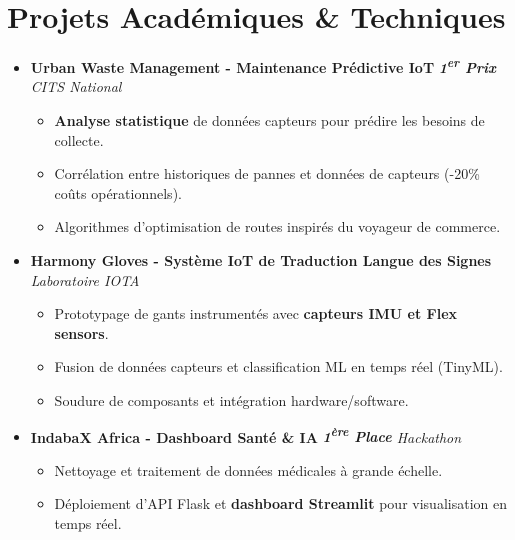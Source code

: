 \documentclass[a4paper,11pt]{article}
\begin{document}
\section{Projets Académiques \& Techniques}
\begin{itemize}[leftmargin=*, label={}]

\item \textbf{Urban Waste Management - Maintenance Prédictive IoT} \hfill \textit{\textbf{1\textsuperscript{er} Prix} CITS National}
\vspace{-2pt}
    \begin{itemize}[leftmargin=0.4cm, nosep, label=\tiny$\bullet$]
        \item \small{\textbf{Analyse statistique} de données capteurs pour prédire les besoins de collecte.}
        \item \small{Corrélation entre historiques de pannes et données de capteurs (-20\% coûts opérationnels).}
        \item \small{Algorithmes d'optimisation de routes inspirés du voyageur de commerce.}
    \end{itemize}
    \vspace{3pt}

\item \textbf{Harmony Gloves - Système IoT de Traduction Langue des Signes} \hfill \textit{Laboratoire IOTA}
\vspace{-2pt}
    \begin{itemize}[leftmargin=0.4cm, nosep, label=\tiny$\bullet$]
        \item \small{Prototypage de gants instrumentés avec \textbf{capteurs IMU et Flex sensors}.}
        \item \small{Fusion de données capteurs et classification ML en temps réel (TinyML).}
        \item \small{Soudure de composants et intégration hardware/software.}
    \end{itemize}
    \vspace{3pt}

\item \textbf{IndabaX Africa - Dashboard Santé \& IA} \hfill \textit{\textbf{1\textsuperscript{ère} Place} Hackathon}
\vspace{-2pt}
    \begin{itemize}[leftmargin=0.4cm, nosep, label=\tiny$\bullet$]
        \item \small{Nettoyage et traitement de données médicales à grande échelle.}
        \item \small{Déploiement d'API Flask et \textbf{dashboard Streamlit} pour visualisation en temps réel.}
    \end{itemize}
    \vspace{3pt}


\end{itemize}
\end{document}
